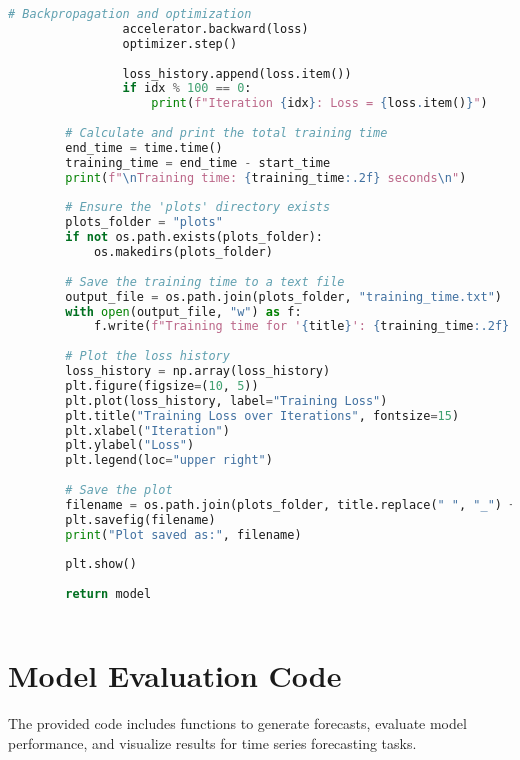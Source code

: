 \begin{lstlisting}[language=Python, caption={Code for training the forecasting model}, breaklines=true, label=code5]
                # Backpropagation and optimization
                accelerator.backward(loss)
                optimizer.step()
    
                loss_history.append(loss.item())
                if idx % 100 == 0:
                    print(f"Iteration {idx}: Loss = {loss.item()}")
    
        # Calculate and print the total training time
        end_time = time.time()
        training_time = end_time - start_time
        print(f"\nTraining time: {training_time:.2f} seconds\n")
    
        # Ensure the 'plots' directory exists
        plots_folder = "plots"
        if not os.path.exists(plots_folder):
            os.makedirs(plots_folder)
    
        # Save the training time to a text file
        output_file = os.path.join(plots_folder, "training_time.txt")
        with open(output_file, "w") as f:
            f.write(f"Training time for '{title}': {training_time:.2f} seconds")
    
        # Plot the loss history
        loss_history = np.array(loss_history)
        plt.figure(figsize=(10, 5))
        plt.plot(loss_history, label="Training Loss")
        plt.title("Training Loss over Iterations", fontsize=15)
        plt.xlabel("Iteration")
        plt.ylabel("Loss")
        plt.legend(loc="upper right")
    
        # Save the plot
        filename = os.path.join(plots_folder, title.replace(" ", "_") + ".png")
        plt.savefig(filename)
        print("Plot saved as:", filename)
    
        plt.show()
    
        return model
    

\end{lstlisting}

\section{Model Evaluation Code}

The provided code includes functions to generate forecasts, evaluate model performance, and visualize results for time series forecasting tasks.

